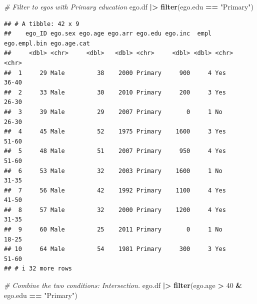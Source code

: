 \documentclass[
]{book}
\newenvironment{Shaded}{\begin{snugshade}}{\end{snugshade}}
\newcommand{\CommentTok}[1]{\textcolor[rgb]{0.56,0.35,0.01}{\textit{#1}}}
\newcommand{\DecValTok}[1]{\textcolor[rgb]{0.00,0.00,0.81}{#1}}
\newcommand{\FunctionTok}[1]{\textcolor[rgb]{0.13,0.29,0.53}{\textbf{#1}}}
\newcommand{\NormalTok}[1]{#1}
\newcommand{\SpecialCharTok}[1]{\textcolor[rgb]{0.81,0.36,0.00}{\textbf{#1}}}
\newcommand{\StringTok}[1]{\textcolor[rgb]{0.31,0.60,0.02}{#1}}
\begin{document}
\begin{Shaded}
\begin{Highlighting}[]
\CommentTok{\# Filter to egos with Primary education}
\NormalTok{ego.df }\SpecialCharTok{|\textgreater{}} 
  \FunctionTok{filter}\NormalTok{(ego.edu }\SpecialCharTok{==} \StringTok{"Primary"}\NormalTok{)}
\end{Highlighting}
\end{Shaded}

\begin{verbatim}
## # A tibble: 42 x 9
##    ego_ID ego.sex ego.age ego.arr ego.edu ego.inc  empl ego.empl.bin ego.age.cat
##     <dbl> <chr>     <dbl>   <dbl> <chr>     <dbl> <dbl> <chr>        <chr>      
##  1     29 Male         38    2000 Primary     900     4 Yes          36-40      
##  2     33 Male         30    2010 Primary     200     3 Yes          26-30      
##  3     39 Male         29    2007 Primary       0     1 No           26-30      
##  4     45 Male         52    1975 Primary    1600     3 Yes          51-60      
##  5     48 Male         51    2007 Primary     950     4 Yes          51-60      
##  6     53 Male         32    2003 Primary    1600     1 No           31-35      
##  7     56 Male         42    1992 Primary    1100     4 Yes          41-50      
##  8     57 Male         32    2000 Primary    1200     4 Yes          31-35      
##  9     60 Male         25    2011 Primary       0     1 No           18-25      
## 10     64 Male         54    1981 Primary     300     3 Yes          51-60      
## # i 32 more rows
\end{verbatim}

\begin{Shaded}
\begin{Highlighting}[]
\CommentTok{\# Combine the two conditions: Intersection.}
\NormalTok{ego.df }\SpecialCharTok{|\textgreater{}} 
  \FunctionTok{filter}\NormalTok{(ego.age }\SpecialCharTok{\textgreater{}} \DecValTok{40} \SpecialCharTok{\&}\NormalTok{ ego.edu }\SpecialCharTok{==} \StringTok{"Primary"}\NormalTok{)}
\end{Highlighting}
\end{Shaded}
\end{document}
